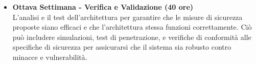 {\begin{itemize}
        \item \textbf{Ottava Settimana - Verifica e Validazione (40 ore)} \\  L'analisi e il test dell'architettura per garantire che le misure di sicurezza proposte siano efficaci e che l'architettura stessa funzioni correttamente. Ciò può includere simulazioni, test di penetrazione, e verifiche di conformità alle specifiche di sicurezza per assicurarsi che il sistema sia robusto contro minacce e vulnerabilità.
    \end{itemize}
    
}

\newcommand{\totaleOre}{320}

\newcommand{\obiettiviObbligatori}{
	 \item \underline{\textit{O01}}: primo obiettivo;
	 \item \underline{\textit{O02}}: secondo obiettivo;
	 \item \underline{\textit{O03}}: terzo obiettivo;
	 
}

\newcommand{\obiettiviDesiderabili}{
	 \item \underline{\textit{D01}}: primo obiettivo;
	 \item \underline{\textit{D02}}: secondo obiettivo;
}

\newcommand{\obiettiviFacoltativi}{
	 \item \underline{\textit{F01}}: primo obiettivo;
	 \item \underline{\textit{F02}}: secondo obiettivo;
	 \item \underline{\textit{F03}}: terzo obiettivo;
}